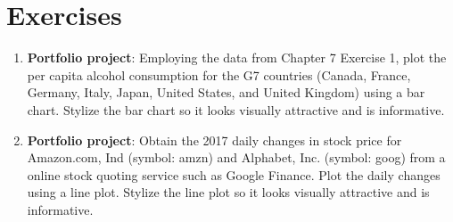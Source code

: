 \documentclass{book}
\begin{document}
\section{Exercises}
\begin{enumerate}
	\item \textbf{Portfolio project}: Employing the data from Chapter 7 Exercise 1, plot the per capita alcohol consumption for the G7 countries (Canada, France, Germany, Italy, Japan, United States, and United Kingdom) using a bar chart. Stylize the bar chart so it looks visually attractive and is informative.
	\item \textbf{Portfolio project}: Obtain the 2017 daily changes in stock price for Amazon.com, Ind (symbol: amzn) and Alphabet, Inc. (symbol: goog) from a online stock quoting service such as Google Finance. Plot the daily changes using a line plot. Stylize the line plot so it looks visually attractive and is informative.
\end{enumerate}
\end{document}

